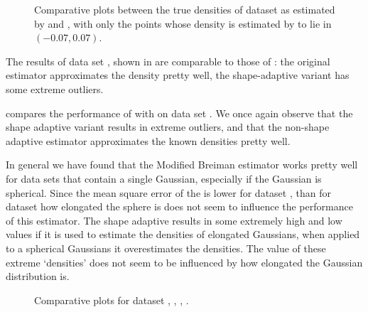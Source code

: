\begin{figure}
\begin{subfigure}{0.7\columnwidth}
				\caption{\sambe}
				\label{fig:results:baakman1::noOUtliers:sambe}
			\end{subfigure}	
			\caption{Comparative plots between the true densities of dataset \baakmanOne as estimated by  \mbe and  \sambe, with only the points whose density is estimated by \sambe to lie in $\left(\num{-0.07}, \num{0.07} \right)$.}
			\label{fig:results:baakman1:noOutliers}
		\end{figure}

		The results of data set \numberstringnum{\baakmanFourNum}, shown in  are comparable to those of \numberstringnum{\baakmanOneNum}: the original estimator approximates the density pretty well, the shape-adaptive variant has some extreme outliers.

		 compares the performance of \mbe with \sambe on data set \numberstringnum{\baakmanFiveNum}. We once again observe that the shape adaptive variant results in extreme outliers, and that the non-shape adaptive estimator approximates the known densities pretty well. 

		In general we have found that the Modified Breiman estimator works pretty well for data sets that contain a single Gaussian, especially if the Gaussian is spherical. Since the mean square error of the \mbe is lower for dataset \baakmanFive, than for dataset \baakmanFour how elongated the sphere is does not seem to influence the performance of this estimator. 
		The shape adaptive \mbe results in some extremely high and low values if it is used to estimate the densities of elongated Gaussians, when applied to a spherical Gaussians it overestimates the densities. The value of these extreme `densities' does not seem to be influenced by how elongated the Gaussian distribution is.


	\begin{figure}
		\centering
		
		\caption{Comparative plots for dataset \ferdosiTwo, \ferdosiThree, \baakmanTwo, \baakmanThree.}
		\label{fig:4:resuts:multiSphere}
	\end{figure}

